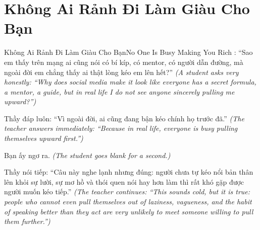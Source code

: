 \section{Không Ai Rảnh Đi Làm Giàu Cho Bạn}
\begin{truyen}{Không Ai Rảnh Đi Làm Giàu Cho Bạn}{No One Is Busy Making You Rich}
: ``Sao em thấy trên mạng ai cũng nói có bí kíp, có mentor, có người dẫn đường, mà ngoài đời em chẳng thấy ai thật lòng kéo em lên hết?''
\textit{(A student asks very honestly: ``Why does social media make it look like everyone has a secret formula, a mentor, a guide, but in real life I do not see anyone sincerely pulling me upward?'')}

Thầy đáp luôn: ``Vì ngoài đời, ai cũng đang bận kéo chính họ trước đã.''
\textit{(The teacher answers immediately: ``Because in real life, everyone is busy pulling themselves upward first.'')}

Bạn ấy ngơ ra.
\textit{(The student goes blank for a second.)}


Thầy nói tiếp: ``Câu này nghe lạnh nhưng đúng: người chưa tự kéo nổi bản thân lên khỏi sự lười, sự mơ hồ và thói quen nói hay hơn làm thì rất khó gặp được người muốn kéo tiếp.''
\textit{(The teacher continues: ``This sounds cold, but it is true: people who cannot even pull themselves out of laziness, vagueness, and the habit of speaking better than they act are very unlikely to meet someone willing to pull them further.'')}
\end{truyen}

